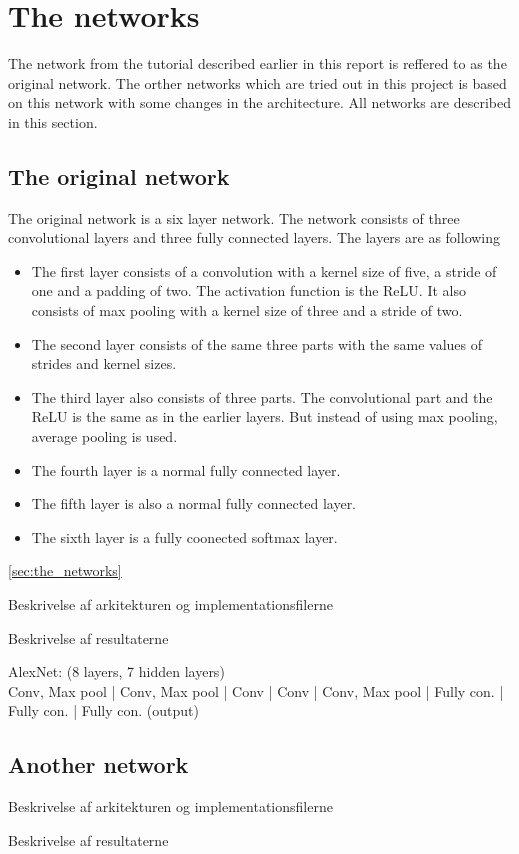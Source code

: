 \graphicspath{{Chapters/Project/}}

\section{The networks} %
\label{sec:the_networks}

The network from the tutorial described earlier in this report is reffered to as the original network. The orther networks which are tried out in this project is based on this network with some changes in the architecture. All networks are described in this section.

\subsection{The original network} %
\label{sub:the_original_network}

The original network is a six layer network. The network consists of three convolutional layers and three fully connected layers. The layers are as following

\begin{itemize}
  \item The first layer consists of a convolution with a kernel size of five, a stride of one and a padding of two. The activation function is the ReLU. It also consists of max pooling with a kernel size of three and a stride of two. 
  \item The second layer consists of the same three parts with the same values of strides and kernel sizes.
  \item The third layer also consists of three parts. The convolutional part and the ReLU is the same as in the earlier layers. But instead of using max pooling, average pooling is used.
  \item The fourth layer is a normal fully connected layer.
  \item The fifth layer is also a normal fully connected layer.
  \item The sixth layer is a fully coonected softmax layer.
\end{itemize}

\autoref{sec:the_networks}

Beskrivelse af arkitekturen og implementationsfilerne

Beskrivelse af resultaterne


AlexNet: (8 layers, 7 hidden layers) \\
 Conv, Max pool | Conv, Max pool | Conv | Conv | Conv, Max pool |
Fully con. | Fully con. | Fully con. (output) 



\subsection{Another network} %
\label{sub:another_network}

Beskrivelse af arkitekturen og implementationsfilerne

Beskrivelse af resultaterne


